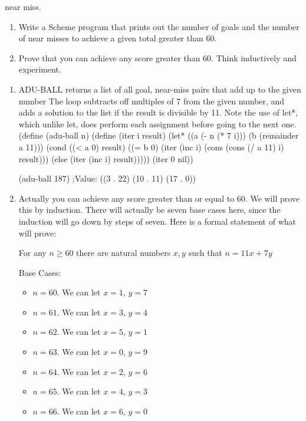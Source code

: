 \documentclass[12pt]{amsart}
\begin{document}
\begin{enumerate}
    near miss.
    \begin{enumerate}
    \item
    Write a Scheme program that prints out the number of goals and
    the number of near misses to achieve a given total greater than
    60.\\
    \item Prove that you can achieve any score greater than 60. Think
    inductively and experiment.\\
    \end{enumerate}
    \begin{enumerate}
    \item
    ADU-BALL returns a list of all goal, near-miss  pairs that add up to the given number
    The loop subtracts off multiples of $7$ from the given number,
    and adds a solution to the list if the result is divisible by
    11. Note the use of let*, which unlike let,
    does perform each assignment before going to the next one.
\beginlisp
(define (adu-ball n)
 (define (iter i result)
  (let* ((a (- n (* 7 i))) (b (remainder a 11)))
   (cond ((< a 0) result)
         ((= b 0) (iter (inc i) (cons (cons (/ a 11) i) result)))
         (else (iter (inc i) result)))))
 (iter 0 nil))
\endlisp \vskip 10pt

\beginlisp
(adu-ball 187)
;Value: ((3 . 22) (10 . 11) (17 . 0))
\endlisp \vskip 10pt
    \item
    Actually you can achieve any score greater than or equal to $60$.
    We will prove this by induction. There will actually be seven base cases
    here, since the induction will go down by steps of seven. Here is a formal
    statement of what will prove:

    For any $n \ge 60$ there are natural numbers $x,y$ such that
    $ n = 11 x + 7 y$

    Base Cases:
    \begin{itemize}
    \item $n=60$. We can let $x=1$, $y=7$ \\
    \item $n=61$. We can let $x=3$, $y=4$ \\
    \item $n=62$. We can let $x=5$, $y=1$ \\
    \item $n=63$. We can let $x=0$, $y=9$ \\
    \item $n=64$. We can let $x=2$, $y=6$ \\
    \item $n=65$. We can let $x=4$, $y=3$ \\
    \item $n=66$. We can let $x=6$, $y=0$ \\
    \end{itemize}


\end{enumerate}
\end{enumerate}
\end{document}
